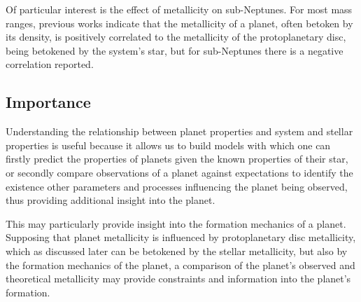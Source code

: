 \documentclass[a4paper,twocolumn,12pt]{article}
\begin{document}
Of particular interest is the effect of metallicity on sub-Neptunes. For most mass ranges, previous works indicate that the metallicity of a planet, often betoken by its density, is positively correlated to the metallicity of the protoplanetary disc, being betokened by the system's star, but for sub-Neptunes there is a negative correlation reported.

\subsection{Importance}
\label{subsection: Importance}
Understanding the relationship between planet properties and system and stellar properties is useful because it allows us to build models with which one can firstly predict the properties of planets given the known properties of their star, or secondly compare observations of a planet against expectations to identify the existence other parameters and processes influencing the planet being observed, thus providing additional insight into the planet. %


This may particularly provide insight into the formation mechanics of a planet. Supposing that planet metallicity is influenced by protoplanetary disc metallicity, which as discussed later can be betokened by the stellar metallicity, but also by the formation mechanics of the planet, a comparison of the planet's observed and theoretical metallicity may provide constraints and information into the planet's formation.


\end{document}
